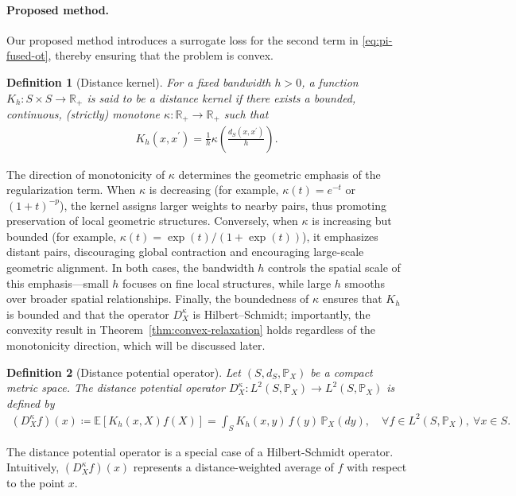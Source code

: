 \documentclass{article}
\newtheorem{definition}{Definition}
\begin{document}
\paragraph{Proposed method.} Our proposed method introduces a surrogate loss for the second term in \eqref{eq:pi-fused-ot}, thereby ensuring that the problem is convex.
\begin{definition}[Distance kernel]
	\label{def:kernel}
	For a fixed bandwidth $h > 0$, a function $K_h: S \times S \to \mathbb{R}_+$ is said to be a \emph{distance kernel} if there exists a bounded, continuous, (strictly) monotone $\kappa: \mathbb{R}_+ \to \mathbb{R}_+$ such that
	\begin{align*}
		K_h(x,x^\prime) = \frac{1}{h}\kappa\left(\frac{d_S(x,x^\prime)}{h}\right) .
	\end{align*}
\end{definition}
The direction of monotonicity of $\kappa$ determines the geometric emphasis of the regularization term. 
When $\kappa$ is decreasing (for example, $\kappa(t) = e^{-t}$ or $(1+t)^{-p}$), the kernel assigns larger weights to nearby pairs, thus promoting preservation of local geometric structures. 
Conversely, when $\kappa$ is increasing but bounded (for example, $\kappa(t)=\exp(t)/(1+\exp(t))$), it emphasizes distant pairs, discouraging global contraction and encouraging large-scale geometric alignment. 
In both cases, the bandwidth $h$ controls the spatial scale of this emphasis—small $h$ focuses on fine local structures, while large $h$ smooths over broader spatial relationships. 
Finally, the boundedness of $\kappa$ ensures that $K_h$ is bounded and that the operator $D_X^{\kappa}$ is Hilbert--Schmidt; importantly, the convexity result in Theorem~\ref{thm:convex-relaxation} holds regardless of the monotonicity direction, which will be discussed later.

\begin{definition}[Distance potential operator]
	\label{def:distance-potential}
	Let $(S,d_S,\mathbb{P}_X)$ be a compact metric space. The \emph{distance potential operator} $D_X^{\kappa} : L^2(S,\mathbb{P}_X) \to L^2(S,\mathbb{P}_X)$ is defined by
	\begin{align*}
		(D_X^{\kappa}f)(x) \coloneqq \mathbb{E}\left[K_h(x,X)f(X)\right] = \int_S K_h(x,y)\, f(y)\, \mathbb{P}_X(dy) , \quad \forall f \in L^2(S,\mathbb{P}_X),\ \forall x \in S .
	\end{align*}
\end{definition}
The distance potential operator is a special case of a Hilbert-Schmidt operator. Intuitively, $(D_X^{\kappa} f)(x)$ represents a distance-weighted average of $f$ with respect to the point $x$.
\end{document}
